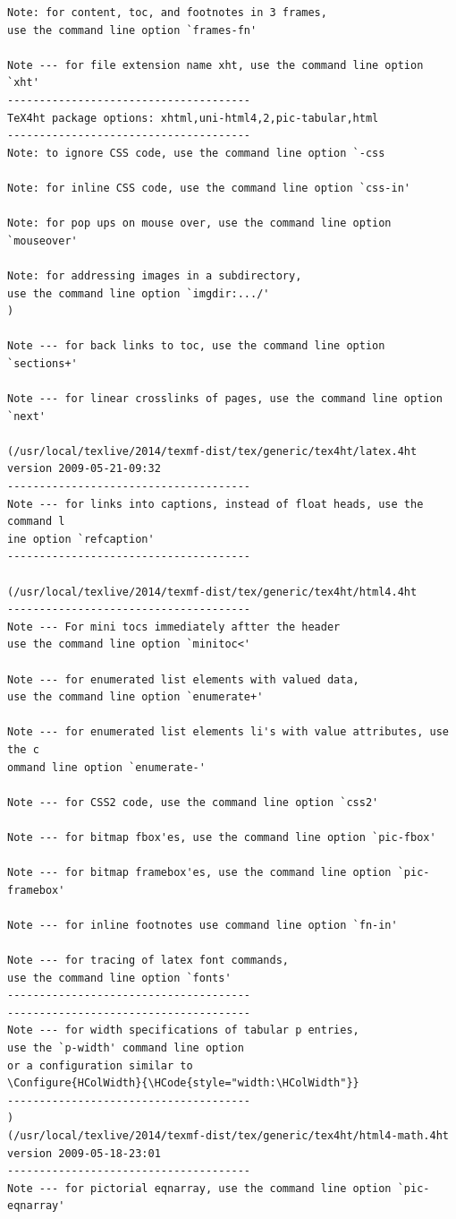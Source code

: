 \begin{Verbatim}[fontsize=\tiny]
Note: for content, toc, and footnotes in 3 frames, 
use the command line option `frames-fn'

Note --- for file extension name xht, use the command line option `xht'
--------------------------------------
TeX4ht package options: xhtml,uni-html4,2,pic-tabular,html
--------------------------------------
Note: to ignore CSS code, use the command line option `-css

Note: for inline CSS code, use the command line option `css-in'

Note: for pop ups on mouse over, use the command line option `mouseover'

Note: for addressing images in a subdirectory, 
use the command line option `imgdir:.../'
)

Note --- for back links to toc, use the command line option `sections+'

Note --- for linear crosslinks of pages, use the command line option `next'

(/usr/local/texlive/2014/texmf-dist/tex/generic/tex4ht/latex.4ht
version 2009-05-21-09:32
--------------------------------------
Note --- for links into captions, instead of float heads, use the command l
ine option `refcaption'
--------------------------------------

(/usr/local/texlive/2014/texmf-dist/tex/generic/tex4ht/html4.4ht
--------------------------------------
Note --- For mini tocs immediately aftter the header 
use the command line option `minitoc<'

Note --- for enumerated list elements with valued data, 
use the command line option `enumerate+'

Note --- for enumerated list elements li's with value attributes, use the c
ommand line option `enumerate-'

Note --- for CSS2 code, use the command line option `css2'

Note --- for bitmap fbox'es, use the command line option `pic-fbox'

Note --- for bitmap framebox'es, use the command line option `pic-framebox'

Note --- for inline footnotes use command line option `fn-in'

Note --- for tracing of latex font commands, 
use the command line option `fonts'
--------------------------------------
--------------------------------------
Note --- for width specifications of tabular p entries, 
use the `p-width' command line option 
or a configuration similar to 
\Configure{HColWidth}{\HCode{style="width:\HColWidth"}}
--------------------------------------
)
(/usr/local/texlive/2014/texmf-dist/tex/generic/tex4ht/html4-math.4ht
version 2009-05-18-23:01
--------------------------------------
Note --- for pictorial eqnarray, use the command line option `pic-eqnarray'


\end{Verbatim}
